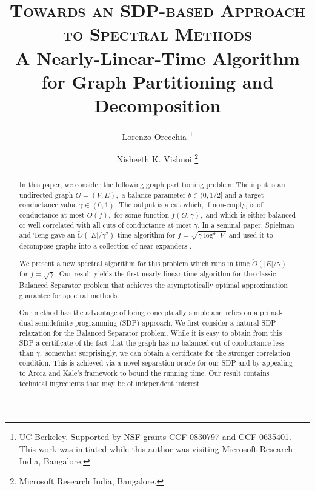 \documentclass[twoside,leqno,twocolumn]{article}
\newcommand{\BS}{{\sc Balanced Separator}\xspace}
\newcommand{\SDP}{{\sf SDP}\xspace}
\numberwithin{equation}{section}
\begin{document}
\title{
  \textsc{Towards an SDP-based Approach to Spectral Methods}\\ {\Large A Nearly-Linear-Time Algorithm for Graph Partitioning and Decomposition}
}

\author{Lorenzo Orecchia  \thanks{UC Berkeley. Supported by NSF grants CCF-0830797 and CCF-0635401. This work was initiated while this author was visiting Microsoft Research India, Bangalore.}\\
\and 
Nisheeth K. Vishnoi \thanks{Microsoft Research India, Bangalore.}}
\date{}




\maketitle	

\begin{abstract}
In this paper, we consider the following graph partitioning problem: The input is an undirected graph $G=(V,E),$ a balance parameter $b \in (0,1/2]$  and a target conductance value $\gamma \in (0,1).$ 
The  output is a cut which, if non-empty, is of conductance at most $O(f),$ for some function $f(G, \gamma),$ and which  is either balanced or well correlated with all cuts of conductance at most $\gamma.$ 
In a seminal paper, Spielman and Teng \cite{ST1} gave an $\tilde{O}(|E|/\gamma^{2})$-time algorithm for $f= \sqrt{\gamma \log^{3}|V|}$ and used it to decompose graphs into a collection of near-expanders \cite{ST2}.

We present a new spectral algorithm for this problem which runs in time $\tilde{O}(|E|/\gamma)$ for $f=\sqrt{\gamma}.$ Our result yields the first nearly-linear time algorithm for the classic \BS problem that achieves the asymptotically optimal approximation guarantee for spectral methods.

Our method has the advantage of being conceptually simple and relies on a primal-dual semidefinite-programming (\SDP) approach. 
We first consider a natural SDP relaxation for the \BS problem.  While it is easy to obtain from this SDP a certificate of the fact that the graph has no balanced cut of conductance less than $\gamma,$ somewhat  surprisingly,  we can obtain a certificate for the stronger correlation condition. 
This is achieved via a novel separation oracle for our SDP and by appealing to Arora and Kale's \cite{AK}  framework to bound the running time.
Our result contains technical ingredients that may be  of independent interest.
\end{abstract}
\end{document}
